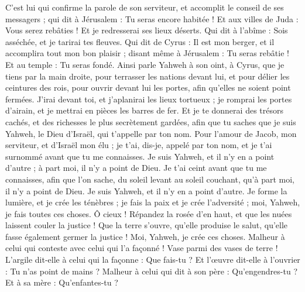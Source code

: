 \begin{multicols}{2}
C'est lui qui confirme la parole de son serviteur, et accomplit le conseil de ses messagers ; qui dit à Jérusalem : Tu seras encore habitée ! Et aux villes de Juda : Vous serez rebâties ! Et je redresserai ses lieux déserts.
Qui dit à l'abîme : Sois asséchée, et je tarirai tes fleuves.
Qui dit de Cyrus : Il est mon berger, et il accomplira tout mon bon plaisir ; disant même à Jérusalem : Tu seras rebâtie ! Et au temple : Tu seras fondé.
\VerseOne{}Ainsi parle Yahweh à son oint, à Cyrus,
que je tiens par la main droite, pour terrasser les nations devant lui, et pour délier les ceintures des rois, pour ouvrir devant lui les portes, afin qu'elles ne soient point fermées.
J'irai devant toi, et j'aplanirai les lieux tortueux ; je romprai les portes d'airain, et je mettrai en pièces les barres de fer. Et je te donnerai des trésors cachés, et des richesses le plus secrètement gardées, afin que tu saches que je suis Yahweh, le Dieu d'Israël, qui t'appelle par ton nom.
Pour l'amour de Jacob, mon serviteur, et d'Israël mon élu ; je t'ai, dis-je, appelé par ton nom, et je t'ai surnommé avant que tu me connaisses.
Je suis Yahweh, et il n'y en a point d'autre ; à part moi, il n'y a point de Dieu. Je t'ai ceint avant que tu me connaisses,
afin que l'on sache, du soleil levant au soleil couchant, qu'à part moi, il n'y a point de Dieu. Je suis Yahweh, et il n'y en a point d'autre.
Je forme la lumière, et je crée les ténèbres ; je fais la paix et je crée l'adversité ; moi, Yahweh, je fais toutes ces choses.
Ô cieux ! Répandez la rosée d'en haut, et que les nuées laissent couler la justice ! Que la terre s'ouvre, qu'elle produise le salut, qu'elle fasse également germer la justice ! Moi, Yahweh, je crée ces choses.
Malheur à celui qui conteste avec celui qui l'a façonné ! Vase parmi des vases de terre ! L'argile dit-elle à celui qui la façonne : Que fais-tu ? Et l'œuvre dit-elle à l'ouvrier : Tu n'as point de mains ?
Malheur à celui qui dit à son père : Qu'engendres-tu ? Et à sa mère : Qu'enfantes-tu ?

\end{multicols}
